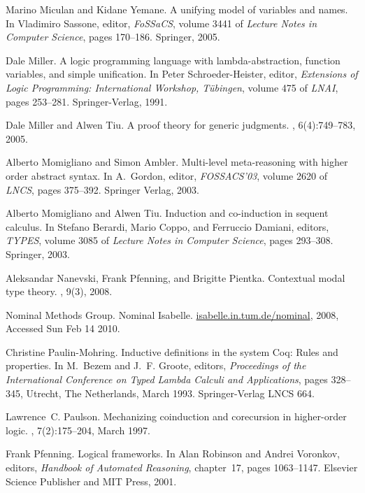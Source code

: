 \documentclass[preprint]{elsarticle}
\begin{document}
\begin{thebibliography}{10}
Marino Miculan and Kidane Yemane.
\newblock A unifying model of variables and names.
\newblock In Vladimiro Sassone, editor, {\em FoSSaCS}, volume 3441 of {\em
  Lecture Notes in Computer Science}, pages 170--186. Springer, 2005.

Dale Miller.
\newblock A logic programming language with lambda-abstraction, function
  variables, and simple unification.
\newblock In Peter Schroeder-Heister, editor, {\em {Extensions of Logic
  Programming: International Workshop, T\"ubingen}}, volume 475 of {\em LNAI},
  pages 253--281. Springer-Verlag, 1991.

Dale Miller and Alwen Tiu.
\newblock A proof theory for generic judgments.
, 6(4):749--783, 2005.

Alberto Momigliano and Simon Ambler.
\newblock Multi-level meta-reasoning with higher order abstract syntax.
\newblock In A.~Gordon, editor, {\em FOSSACS'03}, volume 2620 of {\em LNCS},
  pages 375--392. Springer Verlag, 2003.

Alberto Momigliano and Alwen Tiu.
\newblock Induction and co-induction in sequent calculus.
\newblock In Stefano Berardi, Mario Coppo, and Ferruccio Damiani, editors, {\em
  TYPES}, volume 3085 of {\em Lecture Notes in Computer Science}, pages
  293--308. Springer, 2003.

Aleksandar Nanevski, Frank Pfenning, and Brigitte Pientka.
\newblock Contextual modal type theory.
, 9(3), 2008.

{Nominal Methods Group}.
\newblock Nominal {Isabelle}.
\newblock \url{isabelle.in.tum.de/nominal}, 2008, Accessed Sun Feb 14 2010.

Christine Paulin-Mohring.
\newblock Inductive definitions in the system {Coq}: Rules and properties.
\newblock In M.~Bezem and J.~F. Groote, editors, {\em Proceedings of the
  International Conference on Typed Lambda Calculi and Applications}, pages
  328--345, Utrecht, The Netherlands, March 1993. Springer-Verlag LNCS 664.

Lawrence~C. Paulson.
\newblock Mechanizing coinduction and corecursion in higher-order logic.
, 7(2):175--204, March 1997.

Frank Pfenning.
\newblock Logical frameworks.
\newblock In Alan Robinson and Andrei Voronkov, editors, {\em Handbook of
  Automated Reasoning}, chapter~17, pages 1063--1147. Elsevier Science
  Publisher and MIT Press, 2001.


\end{thebibliography}
\end{document}
